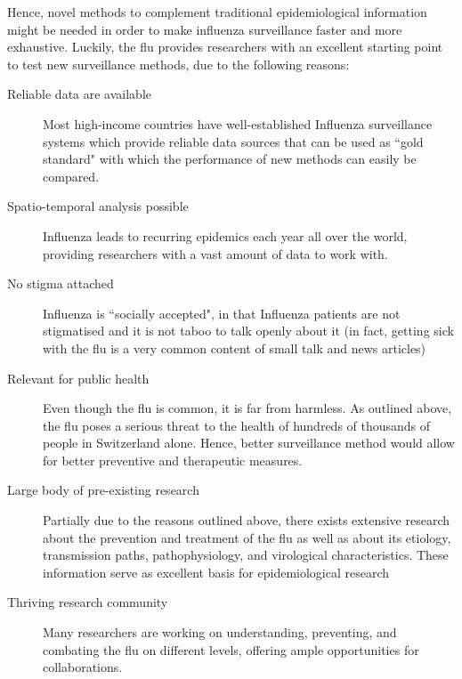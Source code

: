 \documentclass[11pt, a4paper,twoside]{report}\usepackage[]{graphicx}\usepackage[]{color}
\begin{document}
Hence, novel methods to complement traditional epidemiological information might be needed in order to make influenza surveillance faster and more exhaustive. Luckily, the flu provides researchers with an excellent starting point to test new surveillance methods, due to the following reasons: 

\begin{description}
\item [Reliable data are available] Most high-income countries have well-established Influenza surveillance systems which provide reliable data sources that can be used as ``gold standard" with which the performance of new methods can easily be compared.
\item [Spatio-temporal analysis possible] Influenza leads to recurring epidemics each year all over the world, providing researchers with a vast amount of data to work with.
\item [No stigma attached] Influenza is ``socially accepted", in that Influenza patients are not stigmatised and it is not taboo to talk openly about it (in fact, getting sick with the flu is a very common content of small talk and news articles)
\item [Relevant for public health ] Even though the flu is common, it is far from harmless. As outlined above, the flu poses a serious threat to the health of hundreds of thousands of people in Switzerland alone. Hence, better surveillance method would allow for better preventive and therapeutic measures.
\item [Large body of pre-existing research] Partially due to the reasons outlined above, there exists extensive research about the prevention and treatment of the flu as well as about its etiology, transmission paths, pathophysiology, and virological characteristics. These information serve as excellent basis for epidemiological research
\item [Thriving research community] Many researchers are working on understanding, preventing, and combating the flu on different levels, offering ample opportunities for collaborations.
\end{description}
\end{document}
